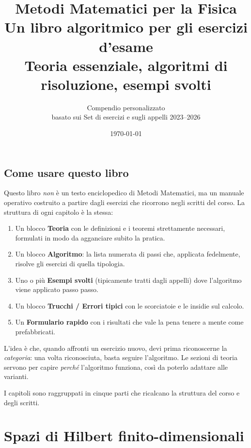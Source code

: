\documentclass[11pt,a4paper,openany]{book}
\title{\Huge\bfseries Metodi Matematici per la Fisica\\[0.5em]
\Large Un libro algoritmico per gli esercizi d'esame\\[0.3em]
\large Teoria essenziale, algoritmi di risoluzione, esempi svolti}
\author{Compendio personalizzato \\ basato sui Set di esercizi e sugli appelli 2023--2026}
\date{\today}
\theoremstyle{definition}
\begin{document}
\frontmatter
\maketitle
\tableofcontents

\chapter*{Come usare questo libro}

Questo libro \emph{non} \`e un testo enciclopedico di Metodi Matematici, ma un manuale operativo costruito a partire dagli esercizi che ricorrono negli scritti del corso. La struttura di ogni capitolo \`e la stessa:

\begin{enumerate}
\item Un blocco \textbf{Teoria} con le definizioni e i teoremi strettamente necessari, formulati in modo da agganciare subito la pratica.
\item Un blocco \textbf{Algoritmo}: la lista numerata di passi che, applicata fedelmente, risolve gli esercizi di quella tipologia.
\item Uno o pi\`u \textbf{Esempi svolti} (tipicamente tratti dagli appelli) dove l'algoritmo viene applicato passo passo.
\item Un blocco \textbf{Trucchi / Errori tipici} con le scorciatoie e le insidie sul calcolo.
\item Un \textbf{Formulario rapido} con i risultati che vale la pena tenere a mente come prefabbricati.
\end{enumerate}

L'idea \`e che, quando affronti un esercizio nuovo, devi prima riconoscerne la \emph{categoria}: una volta riconosciuta, basta seguire l'algoritmo. Le sezioni di teoria servono per capire \emph{perch\'e} l'algoritmo funziona, cos\`i da poterlo adattare alle varianti.

I capitoli sono raggruppati in cinque parti che ricalcano la struttura del corso e degli scritti.

\mainmatter

\part{Spazi di Hilbert finito-dimensionali}
\end{document}
